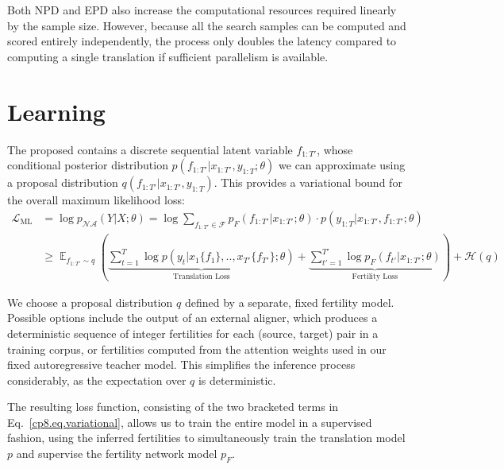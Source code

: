Both NPD and EPD also increase the computational resources required linearly by the sample size. However, because all the search samples can be computed and scored entirely independently, the process only doubles the latency compared to computing a single translation if sufficient parallelism is available.


\section{Learning}
The proposed \model{} contains a discrete sequential latent variable $f_{1:T'}$, whose conditional posterior distribution $p(f_{1:T'} | x_{1:T'}, y_{1:T}; \theta)$ we can approximate using a proposal distribution $q(f_{1:T'} | x_{1:T'}, y_{1:T})$. This provides a variational bound for the overall maximum likelihood loss:
\begin{equation}
\label{cp8.eq.variational}
\begin{split}
\mathcal{L}_{\text{ML}} &= \log p_{\mathcal{NA}}(Y|X; \theta) = \log \sum_{f_{1:T'}\in \mathcal{F}}{p_F(f_{1:T'}|x_{1:T'}; \theta)\cdot p(y_{1:T} | x_{1:T'}, f_{1:T'}; \theta)} \\
&\geq \mathop{\mathbb{E}}_{f_{1:T'} \sim q}\left(\underbrace{\sum_{t=1}^T\log p(y_t| x_1\{f_1\}, .., x_{T'}\{f_{T'}\}; \theta)}_{\text{Translation Loss}} + \underbrace{\sum_{t'=1}^{T'}\log p_F(f_{t'}|x_{1:T'}; \theta)}_{\text{Fertility Loss}} \right) + \mathcal{H}(q)
\end{split}
\end{equation}

We choose a proposal distribution $q$ defined by a separate, fixed fertility model. Possible options include the output of an external aligner, which produces a deterministic sequence of integer fertilities for each (source, target) pair in a training corpus, or fertilities computed from the attention weights used in our fixed autoregressive teacher model. This simplifies the inference process considerably, as the expectation over $q$ is deterministic.

The resulting loss function, consisting of the two bracketed terms in Eq.~\eqref{cp8.eq.variational}, allows us to train the entire model in a supervised fashion, using the inferred fertilities to simultaneously train the translation model $p$ and supervise the fertility network model $p_F$.

